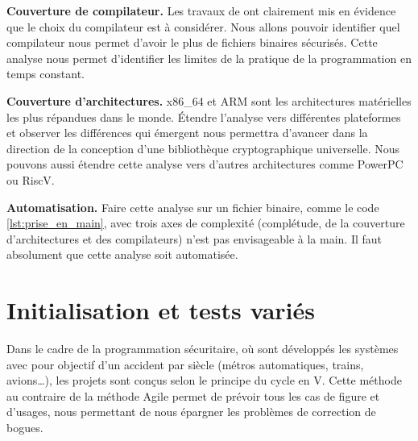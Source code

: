 \textbf{Couverture de compilateur.} Les travaux de \citeauthor{schneider2024breakingbadcompilersbreak} \cite{schneider2024breakingbadcompilersbreak} ont clairement mis en évidence que le choix du compilateur est à considérer. Nous allons pouvoir identifier quel compilateur nous permet d'avoir le plus de fichiers binaires sécurisés. Cette analyse nous permet d'identifier les limites de la pratique de la programmation en temps constant.

\textbf{Couverture d'architectures.} x86\_64 et ARM sont les architectures matérielles les plus répandues dans le monde. Étendre l'analyse vers différentes plateformes et observer les différences qui émergent nous permettra d'avancer dans la direction de la conception d'une bibliothèque cryptographique universelle. Nous pouvons aussi étendre cette analyse vers d'autres architectures comme PowerPC ou RiscV.\medbreak


\textbf{Automatisation.} Faire cette analyse sur un fichier binaire, comme le code \ref{lst:prise_en_main}, avec trois axes de complexité (complétude, de la couverture d'architectures et des compilateurs) n'est pas envisageable à la main. Il faut absolument que cette analyse soit automatisée.


\section{Initialisation et tests variés}

Dans le cadre de la programmation sécuritaire, où sont développés les systèmes avec pour objectif d'un accident par siècle (métros automatiques, trains, avions\dots), les projets sont conçus selon le principe du cycle en V. Cette méthode au contraire de la méthode Agile permet de prévoir tous les cas de figure et d'usages, nous permettant de nous épargner les problèmes de correction de bogues.

